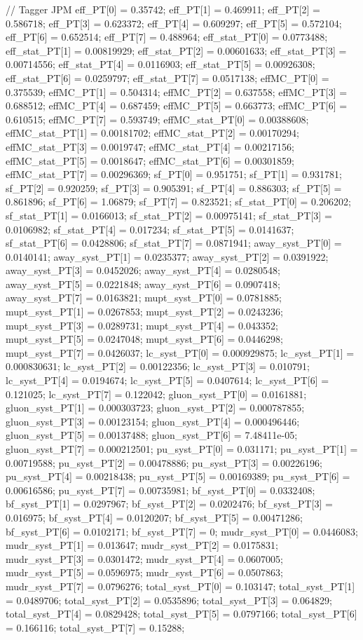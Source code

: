 // Tagger JPM
eff_PT[0] = 0.35742; eff_PT[1] = 0.469911; eff_PT[2] = 0.586718; 
eff_PT[3] = 0.623372; eff_PT[4] = 0.609297; eff_PT[5] = 0.572104; 
eff_PT[6] = 0.652514; eff_PT[7] = 0.488964; 
eff_stat_PT[0] = 0.0773488; eff_stat_PT[1] = 0.00819929; eff_stat_PT[2] = 0.00601633; 
eff_stat_PT[3] = 0.00714556; eff_stat_PT[4] = 0.0116903; eff_stat_PT[5] = 0.00926308; 
eff_stat_PT[6] = 0.0259797; eff_stat_PT[7] = 0.0517138; 
effMC_PT[0] = 0.375539; effMC_PT[1] = 0.504314; effMC_PT[2] = 0.637558; 
effMC_PT[3] = 0.688512; effMC_PT[4] = 0.687459; effMC_PT[5] = 0.663773; 
effMC_PT[6] = 0.610515; effMC_PT[7] = 0.593749; 
effMC_stat_PT[0] = 0.00388608; effMC_stat_PT[1] = 0.00181702; effMC_stat_PT[2] = 0.00170294; 
effMC_stat_PT[3] = 0.0019747; effMC_stat_PT[4] = 0.00217156; effMC_stat_PT[5] = 0.0018647; 
effMC_stat_PT[6] = 0.00301859; effMC_stat_PT[7] = 0.00296369; 
sf_PT[0] = 0.951751; sf_PT[1] = 0.931781; sf_PT[2] = 0.920259; 
sf_PT[3] = 0.905391; sf_PT[4] = 0.886303; sf_PT[5] = 0.861896; 
sf_PT[6] = 1.06879; sf_PT[7] = 0.823521; 
sf_stat_PT[0] = 0.206202; sf_stat_PT[1] = 0.0166013; sf_stat_PT[2] = 0.00975141; 
sf_stat_PT[3] = 0.0106982; sf_stat_PT[4] = 0.017234; sf_stat_PT[5] = 0.0141637; 
sf_stat_PT[6] = 0.0428806; sf_stat_PT[7] = 0.0871941; 
away_syst_PT[0] = 0.0140141; away_syst_PT[1] = 0.0235377; away_syst_PT[2] = 0.0391922; 
away_syst_PT[3] = 0.0452026; away_syst_PT[4] = 0.0280548; away_syst_PT[5] = 0.0221848; 
away_syst_PT[6] = 0.0907418; away_syst_PT[7] = 0.0163821; 
mupt_syst_PT[0] = 0.0781885; mupt_syst_PT[1] = 0.0267853; mupt_syst_PT[2] = 0.0243236; 
mupt_syst_PT[3] = 0.0289731; mupt_syst_PT[4] = 0.043352; mupt_syst_PT[5] = 0.0247048; 
mupt_syst_PT[6] = 0.0446298; mupt_syst_PT[7] = 0.0426037; 
lc_syst_PT[0] = 0.000929875; lc_syst_PT[1] = 0.000830631; lc_syst_PT[2] = 0.00122356; 
lc_syst_PT[3] = 0.010791; lc_syst_PT[4] = 0.0194674; lc_syst_PT[5] = 0.0407614; 
lc_syst_PT[6] = 0.121025; lc_syst_PT[7] = 0.122042; 
gluon_syst_PT[0] = 0.0161881; gluon_syst_PT[1] = 0.000303723; gluon_syst_PT[2] = 0.000787855; 
gluon_syst_PT[3] = 0.00123154; gluon_syst_PT[4] = 0.000496446; gluon_syst_PT[5] = 0.00137488; 
gluon_syst_PT[6] = 7.48411e-05; gluon_syst_PT[7] = 0.000212501; 
pu_syst_PT[0] = 0.031171; pu_syst_PT[1] = 0.00719588; pu_syst_PT[2] = 0.00478886; 
pu_syst_PT[3] = 0.00226196; pu_syst_PT[4] = 0.00218438; pu_syst_PT[5] = 0.00169389; 
pu_syst_PT[6] = 0.00616586; pu_syst_PT[7] = 0.00735981; 
bf_syst_PT[0] = 0.0332408; bf_syst_PT[1] = 0.0297967; bf_syst_PT[2] = 0.0202476; 
bf_syst_PT[3] = 0.016975; bf_syst_PT[4] = 0.0120207; bf_syst_PT[5] = 0.00471286; 
bf_syst_PT[6] = 0.0102171; bf_syst_PT[7] = 0; 
mudr_syst_PT[0] = 0.0446083; mudr_syst_PT[1] = 0.013647; mudr_syst_PT[2] = 0.0175831; 
mudr_syst_PT[3] = 0.0301472; mudr_syst_PT[4] = 0.0607005; mudr_syst_PT[5] = 0.0596975; 
mudr_syst_PT[6] = 0.0507863; mudr_syst_PT[7] = 0.0796276; 
total_syst_PT[0] = 0.103147; total_syst_PT[1] = 0.0489706; total_syst_PT[2] = 0.0535896; 
total_syst_PT[3] = 0.064829; total_syst_PT[4] = 0.0829428; total_syst_PT[5] = 0.0797166; 
total_syst_PT[6] = 0.166116; total_syst_PT[7] = 0.15288; 



